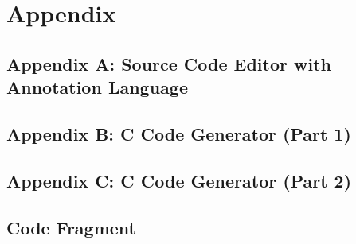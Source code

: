 \chapter{Appendix}

\section{Appendix A: Source Code Editor with Annotation Language}
  \label{Source_Code_Editor_in_Xtext}


\section{Appendix B: C Code Generator (Part 1)}	
	\label{C_Code_Generator_Xtend_Code_Snippet_p1}
	
	
\section{Appendix C: C Code Generator (Part 2)}	
\label{C_Code_Generator_Xtend_Code_Snippet_p2}


\section {Code Fragment}

